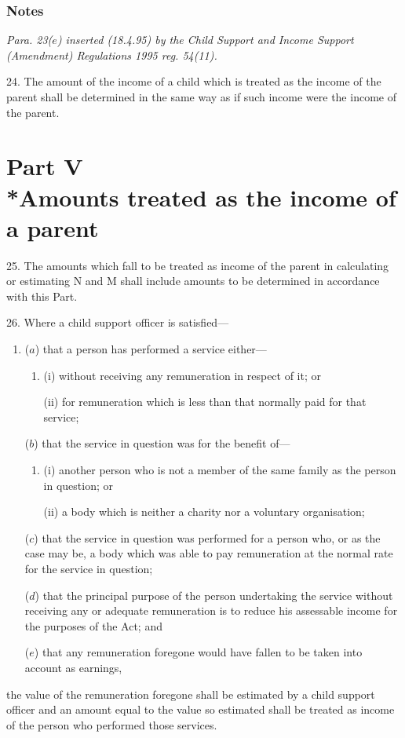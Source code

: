 \documentclass[a4paper]{article}
\newcommand{\parthead}{}
\newcommand\amendment[1]{\subsubsection*{Notes}{\itshape\frenchspacing\footnotesize #1 \par\goodbreak}}
\begin{document}
\amendment{
Para. 23($e$) inserted (18.4.95) by the Child Support and Income Support (Amendment) Regulations 1995 reg. 54(11).
}

\medskip

24.  The amount of the income of a child which is treated as the income of the parent shall be determined in the same way as if such income were the income of the parent.

\section[Part V --- Amounts treated as the income of a parent]{Part V\\*Amounts treated as the income of a parent}

\renewcommand\parthead{--- Schedule 1 Part V}

25.  The amounts which fall to be treated as income of the parent in calculating or estimating N and M shall include amounts to be determined in accordance with this Part.

\medskip

26.  Where a child support officer is satisfied—
\begin{enumerate}\item[]
($a$) that a person has performed a service either—
\begin{enumerate}\item[]
(i) without receiving any remuneration in respect of it; or

(ii) for remuneration which is less than that normally paid for that service;
\end{enumerate}

($b$) that the service in question was for the benefit of—
\begin{enumerate}\item[]
(i) another person who is not a member of the same family as the person in question; or

(ii) a body which is neither a charity nor a voluntary organisation;
\end{enumerate}

($c$) that the service in question was performed for a person who, or as the case may be, a body which was able to pay remuneration at the normal rate for the service in question;

($d$) that the principal purpose of the person undertaking the service without receiving any or adequate remuneration is to reduce his assessable income for the purposes of the Act; and

($e$) that any remuneration foregone would have fallen to be taken into account as earnings,
\end{enumerate}
the value of the remuneration foregone shall be estimated by a child support officer and an amount equal to the value so estimated shall be treated as income of the person who performed those services.
\end{document}
